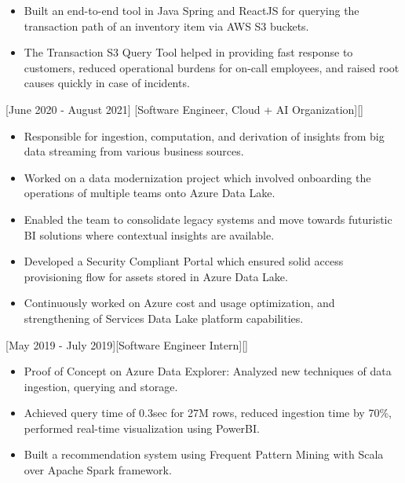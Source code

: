 \documentclass{article}
\begin{document}
\begin{itemize}
\item Built an end-to-end tool in Java Spring and ReactJS for querying the transaction path of an inventory item via AWS S3 buckets.
\item The Transaction S3 Query Tool helped in providing fast response to customers, reduced operational burdens for on-call employees, and raised root causes quickly in case of incidents.

\end{itemize}

[June 2020 - August 2021]
[Software Engineer, Cloud + AI Organization][]

\begin{itemize}
\item Responsible for ingestion, computation, and derivation of insights from big data streaming from various business sources.
\item Worked on a data modernization project which involved onboarding the operations of multiple teams onto Azure Data Lake.
\item Enabled the team to consolidate legacy systems and move towards futuristic BI solutions where contextual insights are available. 
\item Developed a Security Compliant Portal which ensured solid access provisioning flow for assets stored in Azure Data Lake.
\item Continuously worked on Azure cost and usage optimization, and strengthening of Services Data Lake platform capabilities.
\end{itemize}

[May 2019 - July 2019][Software Engineer Intern][]

\begin{itemize}
\item Proof of Concept on Azure Data Explorer: Analyzed new techniques of data ingestion, querying and storage. 
\item Achieved query time of 0.3sec for 27M rows, reduced ingestion time by 70\%, performed real-time visualization using PowerBI.
\item Built a recommendation system using Frequent Pattern Mining with Scala over Apache Spark framework.

\end{itemize}

\end{document}
